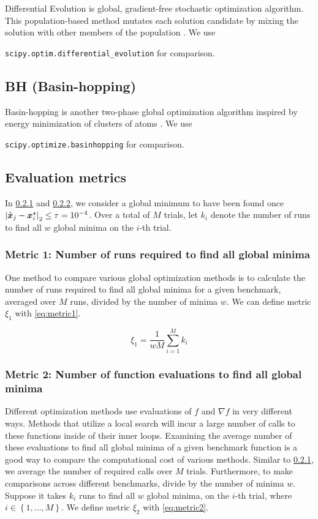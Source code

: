 Differential Evolution is global, gradient-free stochastic optimization algorithm. This population-based method mutates
each solution candidate by mixing the solution with other members of the  population \cite{storn}.
We use

\noindent\texttt{scipy.optim.differential\_evolution} for comparison.

\subsection{BH (Basin-hopping)}
\label{compare:bh}

Basin-hopping is another two-phase global optimization algorithm inspired by energy minimization of clusters of atoms \cite{wales}.
We use

\noindent\texttt{scipy.optimize.basinhopping} for comparison.


\subsection{Evaluation metrics}

In \cref{metric1} and \cref{metric2}, we consider a global minimum to have been found once 
$\left|\hat{\boldsymbol{x}}_j - \boldsymbol{x}^\star_i\right|_2 \leq \tau = 10^{-4}$. Over a total of $M$ trials, let
$k_i$ denote the number of runs to find all $w$ global minima on the $i$-th trial.

\subsubsection{Metric 1: Number of runs required to find all global minima}\label{metric1}

One method to compare various global optimization methods is to calculate the number of runs required to find all
global minima for a given benchmark, averaged over $M$ runs, divided by the number of minima $w$.
We can define metric $\xi_1$ with \cref{eq:metric1}.

\begin{equation}\label{eq:metric1}
\xi_1 = \frac{1}{wM} \sum_{i=1}^M k_i 
\end{equation}

\subsubsection{Metric 2: Number of function evaluations to find all global minima}\label{metric2}

Different optimization methods use evaluations of $f$ and $\nabla f$ in very different ways. Methods that utilize a
local search will incur a large number of calls to these functions inside of their inner loops. Examining the average
number of these evaluations to find all global minima of a given benchmark function is a good way to compare the
computational cost of various methods. Similar to \cref{metric1}, we average the number of required calls over
$M$ trials. Furthermore, to make comparisons across different benchmarks, divide by the number of minima $w$.
Suppose it takes $k_i$ runs to find all $w$ global minima, on the $i$-th trial, 
where $i\in\left\lbrace 1,\ldots, M\right\rbrace$. We define metric $\xi_2$ with \cref{eq:metric2}.

